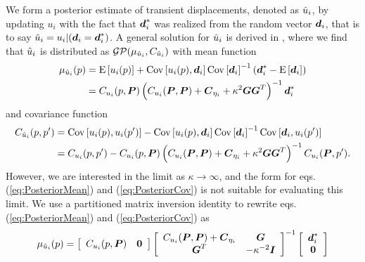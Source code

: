 \documentclass[extra,mreferee]{gji}
\begin{document}

We form a posterior estimate of transient displacements, denoted as
$\hat{u}_i$, by updating $u_i$ with the fact that $\data_i^*$ was
realized from the random vector $\data_i$, that is to say $\post_i =
u_i |(\data_i = \data^*_i)$. A general solution for $\hat{u}_i$ is
derived in \citet[sec. 8.9]{VonMises1964}, where we find that
$\hat{u}_i$ is distributed as $\mathcal{GP}(\mu_{\hat{u}_i},C_{\hat{u}_i})$
with mean function
\begin{align}\label{eq:PosteriorMean}
\mu_{\post_i}(p) &= \E{u_i(p)} + 
                    \Cov{u_i(p),\data_i} 
                    \Cov{\data_i}^{-1}
                    \left(\data^*_i - \E{\data_i}\right)\nonumber \\
                 &= C_{u_i}(p,\points)\left( C_{u_i}(\points,\points) + 
                                             \mitbf{C}_{\eta_i} + 
                                             \kappa^2\G\G^T\right)^{-1}
                    \data^*_i
\end{align}    
and covariance function
\begin{align}\label{eq:PosteriorCov}
C_{\post_i}(p,p') &= \Cov{u_i(p),u_i(p')} - 
                     \Cov{u_i(p),\data_i} 
                     \Cov{\data_i}^{-1}
                     \Cov{\data_i,u_i(p')} \nonumber \\
                  &= C_{u_i}(p,p') - 
                     C_{u_i}(p,\points)\left( C_{u_i}(\points,\points) + 
                                              \mitbf{C}_{\eta_i} + 
                                              \kappa^2\G\G^T \right)^{-1}
                     C_{u_i}(\points,p').
\end{align}
However, we are interested in the limit as $\kappa \to \infty$, and
the form for eqs. (\ref{eq:PosteriorMean}) and (\ref{eq:PosteriorCov})
is not suitable for evaluating this limit. We use a partitioned matrix
inversion identity \citep[sec. 2.7.4]{Press2007} to rewrite eqs.
(\ref{eq:PosteriorMean}) and (\ref{eq:PosteriorCov}) as
\begin{equation}\label{eq:PosteriorMean2}
\mu_{\post_i}(p) = \left[\begin{array}{cc} 
                         C_{u_i}(p,\points) & \zeros \\
                         \end{array}\right]
                   \left[\begin{array}{cc}
                         C_{u_i}(\points,\points) + \mitbf{C}_{\eta_i} & \G \\
                         \G^T  & -\kappa^{-2} \eye \\
                         \end{array}\right]^{-1}
                   \left[\begin{array}{c}
                         \data^*_i \\
                         \zeros \\
                         \end{array}\right]
\end{equation}    
\end{document}
